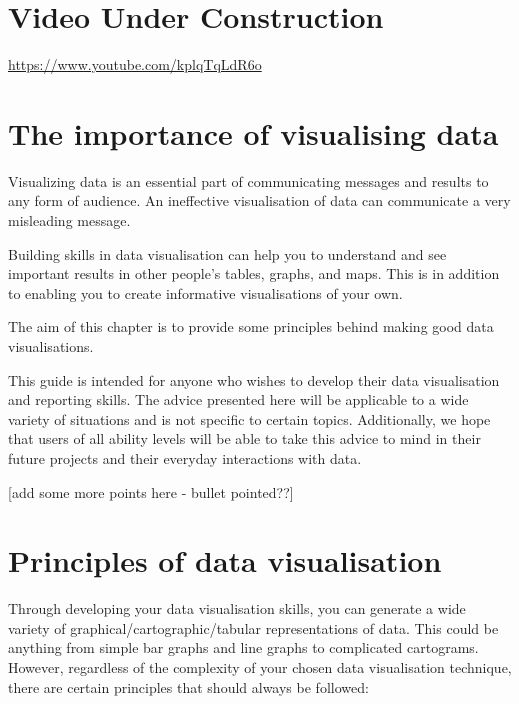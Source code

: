 \documentclass[
]{book}
\begin{document}
\hypertarget{video-under-construction}{%
\section{Video Under Construction}\label{video-under-construction}}

\label{fig:unnamed-chunk-3}\url{https://www.youtube.com/kplqTqLdR6o}

\hypertarget{the-importance-of-visualising-data}{%
\section{The importance of visualising data}\label{the-importance-of-visualising-data}}

Visualizing data is an essential part of communicating messages and results to any form of audience. An ineffective visualisation of data can communicate a very misleading message.

Building skills in data visualisation can help you to understand and see important results in other people's tables, graphs, and maps. This is in addition to enabling you to create informative visualisations of your own.

The aim of this chapter is to provide some principles behind making good data visualisations.

This guide is intended for anyone who wishes to develop their data visualisation and reporting skills. The advice presented here will be applicable to a wide variety of situations and is not specific to certain topics. Additionally, we hope that users of all ability levels will be able to take this advice to mind in their future projects and their everyday interactions with data.

{[}add some more points here - bullet pointed??{]}

\hypertarget{principles-of-data-visualisation}{%
\section{Principles of data visualisation}\label{principles-of-data-visualisation}}

Through developing your data visualisation skills, you can generate a wide variety of graphical/cartographic/tabular representations of data. This could be anything from simple bar graphs and line graphs to complicated cartograms. However, regardless of the complexity of your chosen data visualisation technique, there are certain principles that should always be followed:
\end{document}
